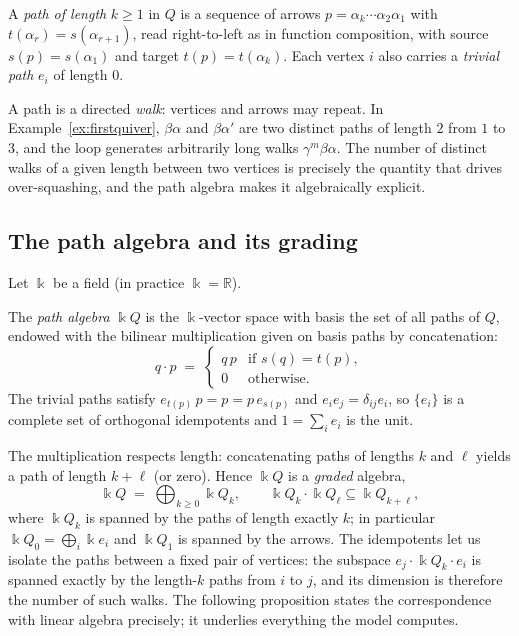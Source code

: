 \documentclass[runningheads]{llncs}
\newcommand{\kk}{\Bbbk}
\newcommand{\kQ}{\kk Q}
\newcommand{\RR}{\mathbb{R}}
\begin{document}
\begin{definition}
A \emph{path of length} $k\ge1$ in $Q$ is a sequence of arrows
$p=\alpha_k\cdots\alpha_2\alpha_1$ with $t(\alpha_r)=s(\alpha_{r+1})$, read
right-to-left as in function composition, with source $s(p)=s(\alpha_1)$ and
target $t(p)=t(\alpha_k)$. Each vertex $i$ also carries a \emph{trivial path}
$e_i$ of length $0$.
\end{definition}

A path is a directed \emph{walk}: vertices and arrows may repeat. In
Example~\ref{ex:firstquiver}, $\beta\alpha$ and $\beta\alpha'$ are two distinct
paths of length $2$ from $1$ to $3$, and the loop generates arbitrarily long
walks $\gamma^m\beta\alpha$. The number of distinct walks of a given length
between two vertices is precisely the quantity that drives over-squashing, and
the path algebra makes it algebraically explicit.

\subsection{The path algebra and its grading}

Let $\kk$ be a field (in practice $\kk=\RR$).

\begin{definition}
The \emph{path algebra} $\kQ$ is the $\kk$-vector space with basis the set of
all paths of $Q$, endowed with the bilinear multiplication given on basis paths
by concatenation:
\[
  q\cdot p \;=\;
  \begin{cases}
    q\,p & \text{if } s(q)=t(p),\\[2pt]
    0 & \text{otherwise.}
  \end{cases}
\]
The trivial paths satisfy $e_{t(p)}\,p=p=p\,e_{s(p)}$ and
$e_ie_j=\delta_{ij}e_i$, so $\{e_i\}$ is a complete set of orthogonal
idempotents and $1=\sum_i e_i$ is the unit.
\end{definition}

The multiplication respects length: concatenating paths of lengths $k$ and
$\ell$ yields a path of length $k+\ell$ (or zero). Hence $\kQ$ is a
\emph{graded} algebra,
\[
  \kQ \;=\; \bigoplus_{k\ge 0}\kQ_k,
  \qquad \kQ_k\cdot \kQ_\ell \subseteq \kQ_{k+\ell},
\]
where $\kQ_k$ is spanned by the paths of length exactly $k$; in particular
$\kQ_0=\bigoplus_i\kk e_i$ and $\kQ_1$ is spanned by the arrows. The
idempotents let us isolate the paths between a fixed pair of vertices: the
subspace $e_j\cdot\kQ_k\cdot e_i$ is spanned exactly by the length-$k$ paths
from $i$ to $j$, and its dimension is therefore the number of such walks. The
following proposition states the correspondence with linear algebra precisely;
it underlies everything the model computes.
\end{document}
